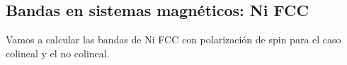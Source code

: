 \subsection{Bandas en sistemas magnéticos: Ni FCC}

  Vamos a calcular las bandas de Ni FCC con polarización de spin para el caso colineal y el no colineal.
  \begin{figure}[H]
      \centering
  \end{figure}
